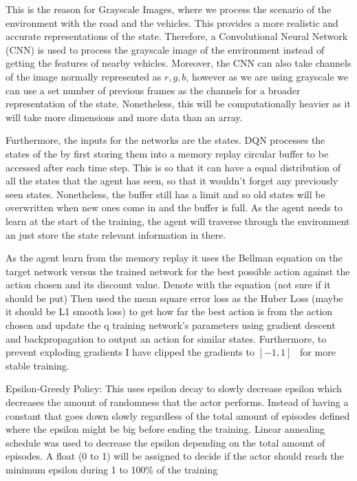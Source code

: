 \documentclass{article}
\begin{document}
This is the reason for Grayscale Images, where we process the scenario of the environment with the road and the vehicles.
This provides a more realistic and accurate representations of the state.
Therefore, a Convolutional Neural Network (CNN) is used to process the grayscale image of the environment instead of getting the features of nearby vehicles.
Moreover, the CNN can also take channels of the image normally represented as \(r,g,b\), however as we are using grayscale we can use a set number of previous frames as the channels for a broader representation of the state.
Nonetheless, this will be computationally heavier as it will take more dimensions and more data than an array.

Furthermore, the inputs for the networks are the states.
DQN processes the states of the by first storing them into a memory replay circular buffer to be accessed after each time step.
This is so that it can have a equal distribution of all the states that the agent has seen, so that it wouldn't forget any previously seen states.
Nonetheless, the buffer still has a limit and so old states will be overwritten when new ones come in and the buffer is full.
As the agent needs to learn at the start of the training, the agent will traverse through the environment an just store the state relevant information in there.

As the agent learn from the memory replay it uses the Bellman equation on the target network versus the trained network for the best possible action against the action chosen and its discount value.
Denote with the equation (not sure if it should be put)
Then used the mean square error loss as the Huber Loss (maybe it should be L1 smooth loss) to get how far the best action is from the action chosen and update the q training network's parameters using gradient descent and backpropagation to output an action for similar states.
Furthermore, to prevent exploding gradients I have clipped the gradients to \([-1,1]\)~\cite{mnih_human-level_2015} for more stable training.

Epsilon-Greedy Policy:
This uses epsilon decay to slowly decrease epsilon which decreases the amount of randomness that the actor performs.
Instead of having a constant that goes down slowly regardless of the total amount of episodes defined where the epsilon might be big before ending the training.
Linear annealing schedule was used to decrease the epsilon depending on the total amount of episodes.
A float (0 to 1) will be assigned to decide if the actor should reach the minimum epsilon during 1 to 100\% of the training
\end{document}

